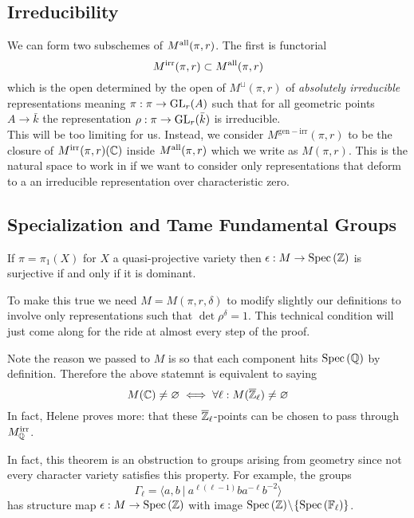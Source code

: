 \documentclass[12pt]{article}
\begin{document}
\subsection{Irreducibility}

\newcommand{\irr}{\mathrm{irr}}

We can form two subschemes of $M^{\mathrm{all}}(\pi, r)$. The first is functorial
\[ M^{\irr}(\pi, r) \subset M^{\all}(\pi, r) \]
which is the open determined by the open of $M^{\sqcup}(\pi, r)$ of \textit{absolutely irreducible} representations meaning $\pi : \pi \to \mathrm{GL}_r(A)$ such that for all geometric points $A \to \bar{k}$ the representation $\rho : \pi \to \mathrm{GL}_r(\bar{k})$ is irreducible. 
\bigskip\\
This will be too limiting for us. Instead, we consider $M^{\mathrm{gen-irr}}(\pi, r)$ to be the closure of $M^{\irr}(\pi, r)(\CC)$ inside $M^{\mathrm{all}}(\pi, r)$ which we write as $M(\pi, r)$. This is the natural space to work in if we want to consider only representations that deform to a an irreducible representation over characteristic zero. 

\subsection{Specialization and Tame Fundamental Groups}

\begin{theorem}
If $\pi = \pi_1(X)$ for $X$ a quasi-projective variety then $\epsilon : M \to \mathrm{Spec}\left( \mathbb{Z} \right)$ is surjective if and only if it is dominant.
\end{theorem}

\begin{rmk}
To make this true we need $M = M(\pi, r, \delta)$ to modify slightly our definitions to involve only representations such that $\det{\rho}^\delta = 1$. This technical condition will just come along for the ride at almost every step of the proof.
\end{rmk}

\begin{rmk}
Note the reason we passed to $M$ is so that each component hits $\mathrm{Spec}\left( \mathbb{Q} \right)$ by definition. Therefore the above statemnt is equivalent to saying 
\[ M(\mathbb{C}) \neq \varnothing \iff \forall \ell : M(\overline{\mathbb{Z}}_{\ell}) \neq \varnothing \]
In fact, Helene proves more: that these $\overline{\mathbb{Z}}_{\ell}$-points can be chosen to pass through $M^{\irr}_{\Q}$.
\end{rmk}

\begin{rmk}
In fact, this theorem is an obstruction to groups arising from geometry since not every character variety satisfies this property. For example, the groups
\[ \Gamma_{\ell} = \langle a,b\ \vert\ a^{\ell(\ell-1)}ba^{-\ell}b^{-2}\rangle \]
has structure map $\epsilon : M \to \mathrm{Spec}\left( \mathbb{Z} \right)$
with image $\mathrm{Spec}\left( \mathbb{Z} \right) \! \setminus \! \{ \mathrm{Spec}\left( \mathbb{F}_\ell \right) \}$.
\end{rmk}
\end{document}
